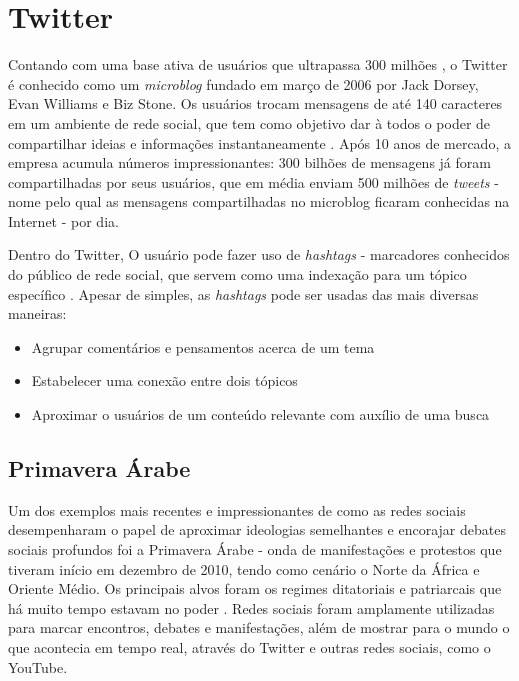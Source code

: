 \section{Twitter}\label{sec:twitter}

Contando com uma base ativa de usuários que ultrapassa 300 milhões \cite{twittercompany2016}, o Twitter é conhecido como um \emph{microblog} fundado em março de 2006 por Jack Dorsey, Evan Williams e Biz Stone. Os usuários trocam mensagens de até 140 caracteres \cite{twittercharlimit2016} em um ambiente de rede social, que tem como objetivo dar à todos o poder de compartilhar ideias e informações instantaneamente \cite{twittercompany2016}. Após 10 anos de mercado, a empresa acumula números impressionantes: 300 bilhões de mensagens já foram compartilhadas por seus usuários, que em média enviam 500 milhões de \emph{tweets} \cite{twitterstats2016} - nome pelo qual as mensagens compartilhadas no microblog ficaram conhecidas na Internet - por dia.

Dentro do Twitter, O usuário pode fazer uso de \emph{hashtags} - marcadores conhecidos do público de rede social, que servem como uma indexação para um tópico específico \cite{waite2012paperback}. Apesar de simples, as \emph{hashtags} pode ser usadas das mais diversas maneiras:
\begin{itemize}
\item Agrupar comentários e pensamentos acerca de um tema
\item Estabelecer uma conexão entre dois tópicos
\item Aproximar o usuários de um conteúdo relevante com auxílio de uma busca
\end{itemize}

\subsection{Primavera Árabe}
Um dos exemplos mais recentes e impressionantes de como as redes sociais desempenharam o papel de aproximar ideologias semelhantes e encorajar debates sociais profundos foi a Primavera Árabe - onda de manifestações e protestos que tiveram início em dezembro de 2010, tendo como cenário o Norte da África e Oriente Médio. Os principais alvos foram os regimes ditatoriais e patriarcais que há muito tempo estavam no poder \cite{howard2011opening}. Redes sociais foram amplamente utilizadas para marcar encontros, debates e manifestações, além de mostrar para o mundo o que acontecia em tempo real, através do Twitter e outras redes sociais, como o YouTube.

